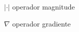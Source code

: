 \begin{basedescript}{\desclabelstyle{\pushlabel}\desclabelwidth{6em}}
\item[$|\cdot|$] operador magnitude%
\item[$\nabla$] operador gradiente%
\end{basedescript}